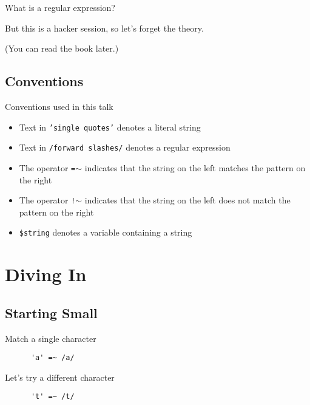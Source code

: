 \documentclass{beamer}
\begin{document}
\begin{frame}{What is a regular expression?}
  \begin{center}
  But this is a hacker session, so let's forget the theory.
  \pause

  (You can read the book later.)
  \end{center}
\end{frame}

\subsection{Conventions}

\begin{frame}{Conventions used in this talk}

  \begin{itemize}
  \item Text in \texttt{'single quotes'} denotes a literal string
  \item Text in \texttt{/forward slashes/} denotes a regular expression
  \item The operator \texttt{=$\sim$} indicates that the string on the left matches the pattern on the right
  \item The operator \texttt{!$\sim$} indicates that the string on the left does not match the pattern on the right
  \item \texttt{\$string} denotes a variable containing a string
  \end{itemize}

\end{frame}

\section{Diving In}

\subsection{Starting Small}

\begin{frame}[fragile]{Match a single character}
  \begin{verbatim}
      'a' =~ /a/
  \end{verbatim}
\end{frame}

\begin{frame}[fragile]{Let's try a different character}
  \begin{verbatim}
      't' =~ /t/
  \end{verbatim}
\end{frame}
\end{document}
